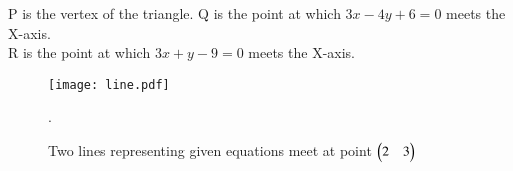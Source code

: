 \documentclass[journal,12pt,twocolumn]{IEEEtran}
\renewcommand\thesection{\arabic{section}}
\begin{document}
\begin{enumerate}[label=\thesection.\arabic*.,ref=\thesection.\theenumi]
\begin{enumerate}
        P is the vertex of the triangle.
        Q is the point at which \(3x-4y+6=0\) meets the X-axis.\\
        R is the point at which \(3x+y-9=0\) meets the X-axis.\\
\end{enumerate}
\begin{figure}[h]
\texttt{[image: line.pdf]}
\caption{Two lines representing given equations meet at point $\begin{pmatrix}2 & 3\end{pmatrix}$ }.
\end{figure}
\end{enumerate}
\end{document}
